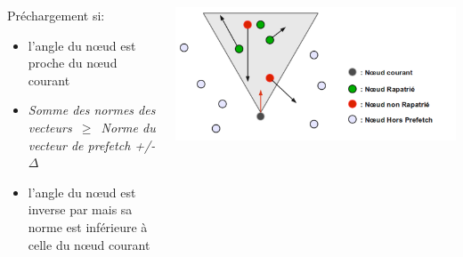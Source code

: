 \documentclass{beamer}
\begin{document}
  \begin{frame}
	\begin{columns}
         \begin{column}{5cm}
	 Préchargement si:
          \begin{itemize}
		\item l'angle du nœud est proche du nœud courant
		\item \textit{Somme des normes des vecteurs~$\ge$~Norme du vecteur de prefetch +/- $\Delta$}
		\item l'angle du nœud est inverse par mais sa norme est inférieure à celle du nœud courant
	  \end{itemize}
	 \end{column}
         \begin{column}{6cm}
          \includegraphics[scale=0.11]{./Ressources/Images/prefetchaV1.png}\\
         \end{column}
        \end{columns}

  \end{frame}
	
\end{document}
